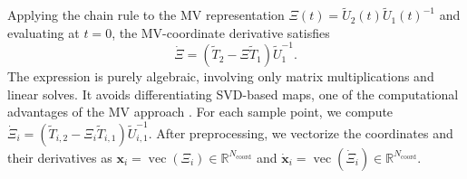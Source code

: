 \documentclass[11pt]{article}
\begin{document}
Applying the chain rule to the MV representation $\Xi(t) = \widetilde U_2(t) \widetilde U_1(t)^{-1}$ and evaluating at $t=0$, the MV-coordinate derivative satisfies \cite{jensen2024maximum, niu2022confluent}
 $$
\dot\Xi = (\widetilde T_2 - \Xi \widetilde T_1)\widetilde U_1^{-1}.
 $$
The expression is purely algebraic, involving only matrix multiplications and linear solves. It  avoids differentiating SVD-based maps, one of the computational advantages of the MV approach \cite{ciaramella2026grassmann}. For each sample point, we compute $\dot\Xi_i = (\widetilde T_{i,2} - \Xi_i \widetilde T_{i,1}) \widetilde U_{i,1}^{-1}$.
After preprocessing, we vectorize the coordinates and their derivatives as $\mathbf{x}_i = \operatorname{vec}(\Xi_i) \in \mathbb{R}^{N_{\text{coord}}}$ and $\dot{\mathbf{x}}_i = \operatorname{vec}(\dot\Xi_i) \in \mathbb{R}^{N_{\text{coord}}}$.

\end{document}
